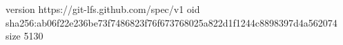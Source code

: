 version https://git-lfs.github.com/spec/v1
oid sha256:ab06f22e236be73f7486823f76f673768025a822d1f1244c8898397d4a562074
size 5130
